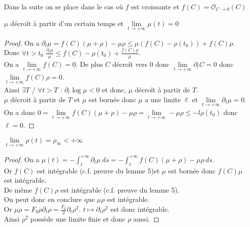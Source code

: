 \documentclass[11pt]{article}
\newcommand{\dt}{\partial_t}
\theoremstyle{definition}
\begin{document}
Dans la suite on se place dans le cas où $f$ est croissante et  $f(C)=\mathcal{O}_{C\to 0}(C)$
\begin{lemma} $\mu$ décroît à partir d'un certain temps et $\underset{t\to+\infty} \lim \mu(t) = 0$ \end{lemma}
\begin{proof} 
On a $\dt \mu = f(C)(\mu + \rho) -\mu\rho \leq \mu (f(C)-\rho(t_0)) + f(C)\rho $.\\
Donc $\forall t>t_0$ $\frac{\dt \mu}{\mu}  \leq f(C)-\rho(t_0) +\frac{f(C)\rho}{\mu}$. \\
On a $\underset{t\to+\infty} \lim f(C) =0$. De plus $C$ décroît vers 0 donc $\underset{t\to+\infty} \lim \dt C = 0$ donc $\underset{t\to+\infty} \lim f(C)\rho =0$. \\
Ainsi $\exists T$ / $\forall t>T$ : $ \dt \log\mu < 0$ et donc, $\mu $ décroît à partir de $T$.\\
$\mu$ décroit à partir de $T$ et $\mu$ est bornée donc $\mu$ a une limite $\ell$ et $\underset{t\to+\infty} \lim \dt \mu = 0$.\\
On a donc $0 = \underset{t\to+\infty} \lim f(C)(\mu+\rho)-\mu\rho = \underset{t\to+\infty} \lim -\mu\rho  \leq -l\rho(t_0)$ donc $\ell =0$.
\end{proof}
\begin{lemma} $\underset{t\to+\infty} \lim \rho(t) =\rho_\infty < +\infty $ \end{lemma}
\begin{proof}
On a $ \mu(t) = - \int_t^{+\infty}\dt \mu \ ds = - \int_t^{+\infty} f(C)(\mu+\rho)-\mu\rho \ ds$.\\
Or $f(C)$ est intégrable (c.f. preuve du lemme 5)et $\mu$ est bornée donc $f(C)\mu$ est intégrable.\\
De même $ f(C)\rho$ est intégrable (c.f. preuve du lemme 5).\\
On peut donc en conclure que $\mu\rho$ est intégrable.\\
Or $\mu\rho= F_0\rho\dt\rho = \frac{F_0}{2}\dt \rho ^2$. $t \mapsto \dt\rho ^2$ est donc intégrable. \\Ainsi $\rho^2$ possède une limite finie et donc $\rho$ aussi.
\end{proof}
\end{document}
